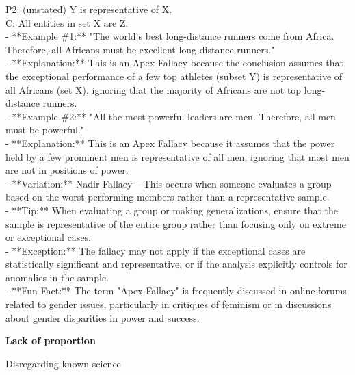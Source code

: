 \documentclass[a4paper,12pt,single,pdftex]{scrartcl}
\begin{document}
    
      P2: (unstated) Y is representative of X.
    \\

    
      C: All entities in set X are Z.
    \\

    
      - **Example \#1:** "The world's best long-distance runners come from Africa. Therefore, all Africans must be excellent long-distance runners."
    \\

    
      - **Explanation:** This is an Apex Fallacy because the conclusion assumes that the exceptional performance of a few top athletes (subset Y) is representative of all Africans (set X), ignoring that the majority of Africans are not top long-distance runners.
    \\

    
      - **Example \#2:** "All the most powerful leaders are men. Therefore, all men must be powerful."
    \\

    
      - **Explanation:** This is an Apex Fallacy because it assumes that the power held by a few prominent men is representative of all men, ignoring that most men are not in positions of power.
    \\

    
      - **Variation:** Nadir Fallacy – This occurs when someone evaluates a group based on the worst-performing members rather than a representative sample.
    \\

    
      - **Tip:** When evaluating a group or making generalizations, ensure that the sample is representative of the entire group rather than focusing only on extreme or exceptional cases.
    \\

    
      - **Exception:** The fallacy may not apply if the exceptional cases are statistically significant and representative, or if the analysis explicitly controls for anomalies in the sample.
    \\

    
      - **Fun Fact:** The term "Apex Fallacy" is frequently discussed in online forums related to gender issues, particularly in critiques of feminism or in discussions about gender disparities in power and success.
    \\

  \par \textbf{Lack of proportion}


Disregarding known science
\end{document}
